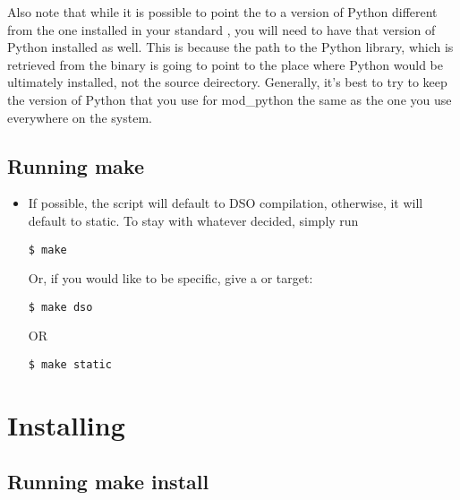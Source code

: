 \begin{itemize}
Also note that while it is possible to point the 
to a version of Python different from the one installed in your standard
, you will need to have that version of Python installed as well.
This is because the path to the Python library, which is retrieved from the
 binary is going to point to the
place where Python would be ultimately installed, not the source
deirectory. Generally, it's best to try to keep the version of Python that
you use for mod_python the same as the one you use everywhere on the system.

\end{itemize}

\subsection{Running make\label{inst-make}}

\begin{itemize}

\item
If possible, the  script will default to DSO
compilation, otherwise, it will default to static. To stay with
whatever  decided, simply run
\begin{verbatim}
$ make
\end{verbatim}


Or, if you would like to be specific, give  a
 or  target:
\begin{verbatim}
$ make dso
\end{verbatim}
OR
\begin{verbatim}
$ make static
\end{verbatim}

\end{itemize}

\section{Installing\label{inst-installing}}

\subsection{Running make install\label{inst-makeinstall}}

